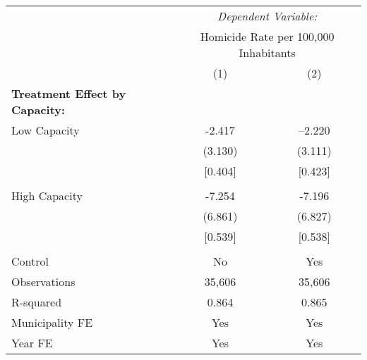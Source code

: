 \documentclass[]{article}
\begin{document}
\begin{table}[htbp]
\centering
\begin{tabular}{lcc}
\toprule
& \multicolumn{2}{c}{\textit{Dependent Variable:}} \\
& \multicolumn{2}{c}{Homicide Rate per 100,000 Inhabitants} \\
\cmidrule(lr){2-3}
& (1) & (2) \\
\midrule
\textbf{Treatment Effect by Capacity: }& & \\
\hspace{3mm}Low Capacity &  -2.417 & --2.220 \\
& (3.130) & (3.111) \\
& [0.404] & [0.423] \\
 &  &  \\
\hspace{3mm}High Capacity & -7.254 & -7.196 \\
& (6.861) & (6.827) \\
& [0.539] & [0.538] \\
 &  &  \\
 \midrule
Control & No & Yes \\ 
Observations & 35,606 & 35,606 \\
R-squared & 0.864 & 0.865 \\
Municipality FE & Yes & Yes \\
Year FE & Yes & Yes \\
\bottomrule
\end{tabular}
\end{table}
\end{document}
